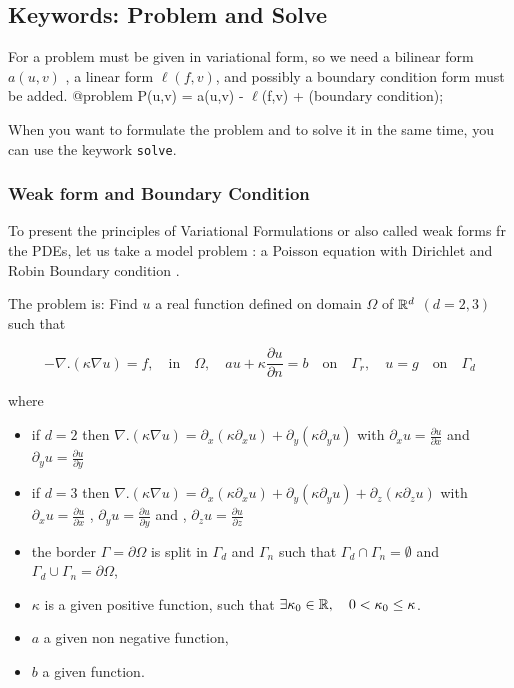 \documentclass[a4paper,twoside,12pt]{book}
\def\p{\partial}
\begin{document}
\subsection{Keywords: Problem and Solve}

 For \freefempp  a problem must be given in variational form, %
 so we need a bilinear form $a(u,v)$ , a linear form $\ell(f,v)$,
and possibly a boundary condition form must be added.
\bFF
@problem P(u,v) =
     a(u,v) - $\ell$(f,v)
     + (boundary condition);
\eFF


\begin{note} When you want to formulate the problem and to solve it
in the same time, you can use the keywork \texttt{solve}.
\end{note}

\subsubsection{Weak form and Boundary Condition}

To present the principles  of Variational Formulations or also called weak forms fr the PDEs,
let us take a model problem : a Poisson equation with  Dirichlet and Robin Boundary condition
.

The problem is: Find $u$ a real function defined on  domain $\Omega$ of $\mathbb{R}^d$ $(d=2,3)$ such that

\begin{equation} -  \nabla.(\kappa \nabla u) = f  , \quad \mbox{in}\quad \Omega, \quad
 a u + \kappa \frac{\p u}{\p n} = b \quad\mbox{on}\quad \Gamma_r, \quad
 u = g  \quad\mbox{on}\quad \Gamma_d
 \end{equation}

where
\begin{itemize}
\item if $d=2$ then  $ \nabla.(\kappa \nabla u) = \p_x(\kappa \p_x u ) + \p_y(\kappa \p_y u ) $
with $ \p_x u = \frac{\p u}{\p x}$
and $\p_y u = \frac{\p u}{\p y}$
\item if $d=3$ then $ \nabla.(\kappa \nabla u) = \p_x(\kappa \p_x u ) + \p_y(\kappa \p_y u ) +  \p_z(\kappa \p_z u ) $
with $ \p_x u = \frac{\p u}{\p x}$
, $\p_y u = \frac{\p u}{\p y}$ and , $\p_z u = \frac{\p u}{\p z}$

\item the border $\Gamma=\p \Omega$ is split in $\Gamma_d$ and $\Gamma_n$
such that $\Gamma_d \cap \Gamma_n = \emptyset$ and $ \Gamma_d \cup \Gamma_n = \p \Omega$,
\item $\kappa$ is a given positive function, such that $\exists \kappa_0 \in \mathbb{R} ,\quad 0 < \kappa_0  \leq \kappa $.
\item  $a$ a given non negative function,
\item  $ b$ a given function.
\end{itemize}
\end{document}
